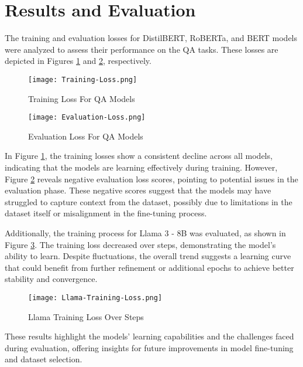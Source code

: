 \documentclass[conference]{IEEEtran}
\begin{document}
\section{Results and Evaluation}

    The training and evaluation losses for DistilBERT, RoBERTa, and BERT models were analyzed to assess their performance on the QA tasks. These losses are depicted in Figures \ref{fig:training-loss-qa} and \ref{fig:evalutation-loss-qa}, respectively.
    {\\}

    \begin{figure}
        \centering
        \texttt{[image: Training-Loss.png]}
        \caption{Training Loss For QA Models}
        \label{fig:training-loss-qa}
    \end{figure}

    \begin{figure}
        \centering
        \texttt{[image: Evaluation-Loss.png]}
        \caption{Evaluation Loss For QA Models}
        \label{fig:evalutation-loss-qa}
    \end{figure}

    In Figure \ref{fig:training-loss-qa}, the training losses show a consistent decline across all models, indicating that the models are learning effectively during training. However, Figure \ref{fig:evalutation-loss-qa} reveals negative evaluation loss scores, pointing to potential issues in the evaluation phase. These negative scores suggest that the models may have struggled to capture context from the dataset, possibly due to limitations in the dataset itself or misalignment in the fine-tuning process.
    {\\}

    Additionally, the training process for Llama 3 - 8B was evaluated, as shown in Figure \ref{fig:llama-training-loss}. The training loss decreased over steps, demonstrating the model's ability to learn. Despite fluctuations, the overall trend suggests a learning curve that could benefit from further refinement or additional epochs to achieve better stability and convergence.

    \begin{figure}
        \centering
        \texttt{[image: Llama-Training-Loss.png]}
        \caption{Llama Training Loss Over Steps}
        \label{fig:llama-training-loss}
    \end{figure}

    These results highlight the models' learning capabilities and the challenges faced during evaluation, offering insights for future improvements in model fine-tuning and dataset selection.
\end{document}
